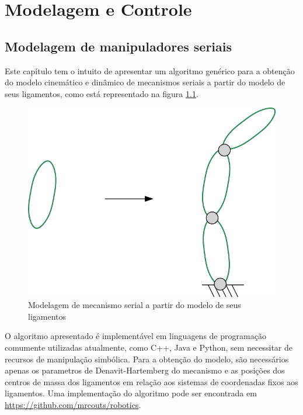 \documentclass[]{politex}
\begin{document}

\part{Modelagem e Controle}
	
\chapter{Modelagem de manipuladores seriais} \label{cap:Seriais}

Este capítulo tem o intuito de apresentar um algoritmo genérico para a obtenção do modelo cinemático e dinâmico de mecanismos seriais a partir do modelo de seus ligamentos, como está representado na figura \ref{fig:AcoplamentoMecSerialFig}. 
\begin{figure}[h]
	\centering
	\includegraphics[scale=1.0]{imagens/Elo2Serial.jpg}  
	\caption{Modelagem de mecanismo serial a partir do modelo de seus ligamentos}
	\label{fig:AcoplamentoMecSerialFig}
\end{figure}

O algoritmo apresentado é implementável em linguagens de programação comumente utilizadas atualmente, como C++, Java e Python, sem necessitar de recursos de manipulação simbólica. Para a obtenção do modelo, são necessários apenas os parametros de Denavit-Hartemberg \cite{Craig, Denavit, Lipkin, Cabral} do mecanismo e as posições dos centros de massa dos ligamentos em relação aos sistemas de coordenadas fixos aos ligamentos. Uma implementação do algoritmo pode ser encontrada em \url{https://github.com/mrcouts/robotics}.
\end{document}
